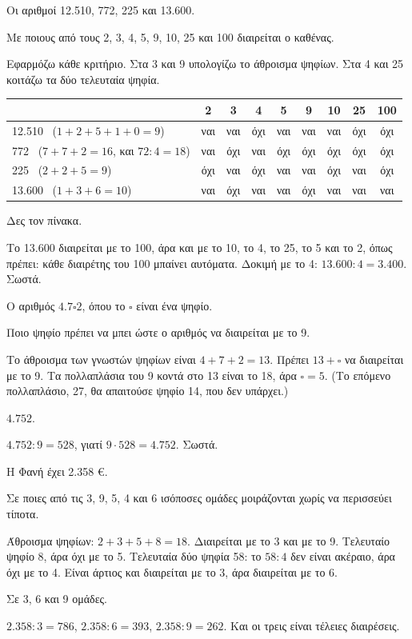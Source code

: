 
\tixero Οι αριθμοί 12.510, 772, 225 και 13.600.\par
\tithelo Με ποιους από τους 2, 3, 4, 5, 9, 10, 25 και 100 διαιρείται ο καθένας.\par
\possindeo Εφαρμόζω κάθε κριτήριο. Στα 3 και 9 υπολογίζω το άθροισμα ψηφίων. Στα 4 και 25 κοιτάζω τα δύο τελευταία ψηφία.

\begin{center}
\small\renewcommand{\arraystretch}{1.3}\setlength{\tabcolsep}{4pt}
\begin{tabular}{@{}lcccccccc@{}}
\toprule
 & 2 & 3 & 4 & 5 & 9 & 10 & 25 & 100\\
\midrule
12.510 \ ($1+2+5+1+0=9$) & ναι & ναι & όχι & ναι & ναι & ναι & όχι & όχι\\
772 \ ($7+7+2=16$, και $72:4=18$) & ναι & όχι & ναι & όχι & όχι & όχι & όχι & όχι\\
225 \ ($2+2+5=9$) & όχι & ναι & όχι & ναι & ναι & όχι & ναι & όχι\\
13.600 \ ($1+3+6=10$) & ναι & όχι & ναι & ναι & όχι & ναι & ναι & ναι\\
\bottomrule
\end{tabular}
\end{center}

\apantisi Δες τον πίνακα.\par
\elegxos Το 13.600 διαιρείται με το 100, άρα και με το 10, το 4, το 25, το 5 και το 2, όπως πρέπει: κάθε διαιρέτης του 100 μπαίνει αυτόματα. Δοκιμή με το 4: $13.600:4=3.400$. Σωστά.

\tixero Ο αριθμός $4.7\square 2$, όπου το $\square$ είναι ένα ψηφίο.\par
\tithelo Ποιο ψηφίο πρέπει να μπει ώστε ο αριθμός να διαιρείται με το 9.\par
\possindeo Το άθροισμα των γνωστών ψηφίων είναι $4+7+2=13$. Πρέπει $13+\square$ να διαιρείται με το 9. Τα πολλαπλάσια του 9 κοντά στο 13 είναι το 18, άρα $\square=5$. (Το επόμενο πολλαπλάσιο, 27, θα απαιτούσε ψηφίο 14, που δεν υπάρχει.)\par
\apantisi $4.752$.\par
\elegxos $4.752:9=528$, γιατί $9\cdot 528=4.752$. Σωστά.

\tixero Η Φανή έχει 2.358 €.\par
\tithelo Σε ποιες από τις 3, 9, 5, 4 και 6 ισόποσες ομάδες μοιράζονται χωρίς να περισσεύει τίποτα.\par
\possindeo Άθροισμα ψηφίων: $2+3+5+8=18$. Διαιρείται με το 3 και με το 9. Τελευταίο ψηφίο 8, άρα όχι με το 5. Τελευταία δύο ψηφία 58: το $58:4$ δεν είναι ακέραιο, άρα όχι με το 4. Είναι άρτιος και διαιρείται με το 3, άρα διαιρείται με το 6.\par
\apantisi Σε 3, 6 και 9 ομάδες.\par
\elegxos $2.358:3=786$, $2.358:6=393$, $2.358:9=262$. Και οι τρεις είναι τέλειες διαιρέσεις.

